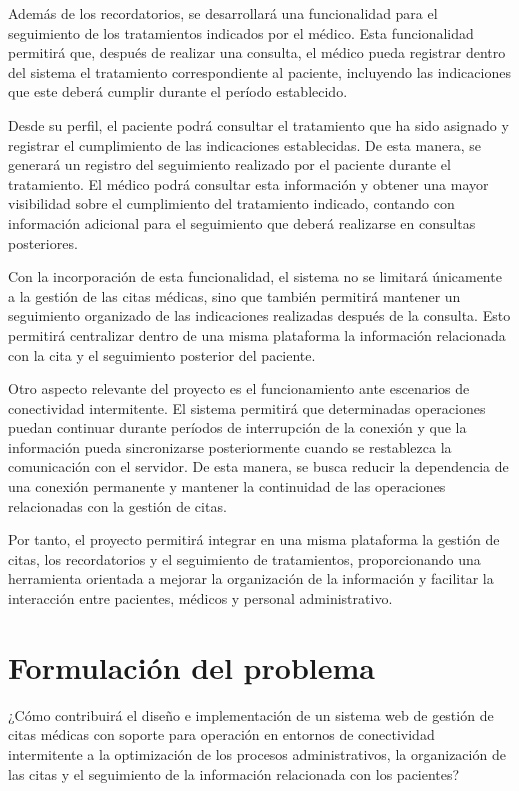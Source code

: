 Además de los recordatorios, se desarrollará una funcionalidad para el seguimiento de los tratamientos indicados por el médico. Esta funcionalidad permitirá que, después de realizar una consulta, el médico pueda registrar dentro del sistema el tratamiento correspondiente al paciente, incluyendo las indicaciones que este deberá cumplir durante el período establecido.

Desde su perfil, el paciente podrá consultar el tratamiento que ha sido asignado y registrar el cumplimiento de las indicaciones establecidas. De esta manera, se generará un registro del seguimiento realizado por el paciente durante el tratamiento. El médico podrá consultar esta información y obtener una mayor visibilidad sobre el cumplimiento del tratamiento indicado, contando con información adicional para el seguimiento que deberá realizarse en consultas posteriores.

Con la incorporación de esta funcionalidad, el sistema no se limitará únicamente a la gestión de las citas médicas, sino que también permitirá mantener un seguimiento organizado de las indicaciones realizadas después de la consulta. Esto permitirá centralizar dentro de una misma plataforma la información relacionada con la cita y el seguimiento posterior del paciente.

Otro aspecto relevante del proyecto es el funcionamiento ante escenarios de conectividad intermitente. El sistema permitirá que determinadas operaciones puedan continuar durante períodos de interrupción de la conexión y que la información pueda sincronizarse posteriormente cuando se restablezca la comunicación con el servidor. De esta manera, se busca reducir la dependencia de una conexión permanente y mantener la continuidad de las operaciones relacionadas con la gestión de citas.

Por tanto, el proyecto permitirá integrar en una misma plataforma la gestión de citas, los recordatorios y el seguimiento de tratamientos, proporcionando una herramienta orientada a mejorar la organización de la información y facilitar la interacción entre pacientes, médicos y personal administrativo.

\section{Formulación del problema}

¿Cómo contribuirá el diseño e implementación de un sistema web de gestión de citas médicas con soporte para operación en entornos de conectividad intermitente a la optimización de los procesos administrativos, la organización de las citas y el seguimiento de la información relacionada con los pacientes?

